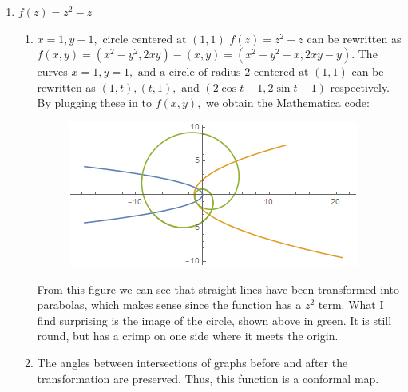 \documentclass{article}
\begin{document}
\begin{enumerate}
	\item $f(z)=z^2-z$
	\begin{enumerate}
		\item $x=1,y-1,\text{ circle centered at } (1,1)$
		$f(z)=z^2-z$ can be rewritten as $f(x,y)=(x^2-y^2,2xy)-(x,y)=(x^2-y^2-x,2xy-y)$. The curves $x=1,y=1, \text{ and a circle of radius 2 centered at }(1,1)$ can be rewritten as $(1,t),(t,1),$ and $(2\cos{t}-1,2\sin{t}-1)$ respectively. By plugging these in to $f(x,y),$ we obtain the Mathematica code:
			\begin{figure}[H]
			\includegraphics[scale=0.8]{image5.png}
			\end{figure}
		From this figure we can see that straight lines have been transformed into parabolas, which makes sense since the function has a $z^2$ term. What I find surprising is the image of the circle, shown above in green. It is still round, but has a crimp on one side where it meets the origin.
		\item The angles between intersections of graphs before and after the transformation are preserved. Thus, this function is a conformal map.
	\end{enumerate}
	

\end{enumerate}
\end{document}
